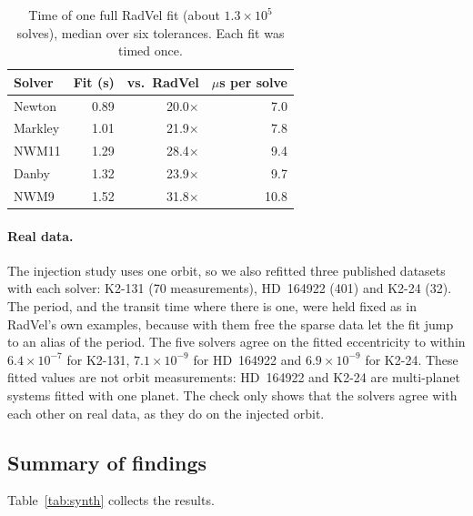 \documentclass[sigconf,nonacm]{acmart}
\begin{document}
\begin{table}[h]
\centering\small
\caption{Time of one full RadVel fit (about $1.3\times10^{5}$ solves),
median over six tolerances. Each fit was timed once.}
\label{tab:fit}
\begin{tabular}{@{}lrrr@{}}
\toprule
\textbf{Solver} & \textbf{Fit (s)} & \textbf{vs.\ RadVel} & \textbf{$\mu$s per solve} \\
\midrule
Newton  & 0.89 & 20.0$\times$ & 7.0 \\
Markley & 1.01 & 21.9$\times$ & 7.8 \\
NWM11   & 1.29 & 28.4$\times$ & 9.4 \\
Danby   & 1.32 & 23.9$\times$ & 9.7 \\
NWM9    & 1.52 & 31.8$\times$ & 10.8 \\
\bottomrule
\end{tabular}
\end{table}

\paragraph{Real data.} The injection study uses one orbit, so we also
refitted three published datasets with each solver: K2-131 \cite{dai2017}
(70 measurements), HD~164922 \cite{hd164922} (401) and K2-24
\cite{petigura2016,petigura2018} (32). The period, and the transit time
where there is one, were held fixed as in RadVel's own examples, because
with them free the sparse data let the fit jump to an alias of the
period. The five solvers
agree on the fitted eccentricity to within $6.4\times10^{-7}$ for K2-131,
$7.1\times10^{-9}$ for HD~164922 and $6.9\times10^{-9}$ for K2-24. These
fitted values are not orbit measurements: HD~164922 and K2-24 are
multi-planet systems fitted with one planet. The check only shows that the
solvers agree with each other on real data, as they do on the injected
orbit.

\subsection{Summary of findings}

Table~\ref{tab:synth} collects the results.
\end{document}
